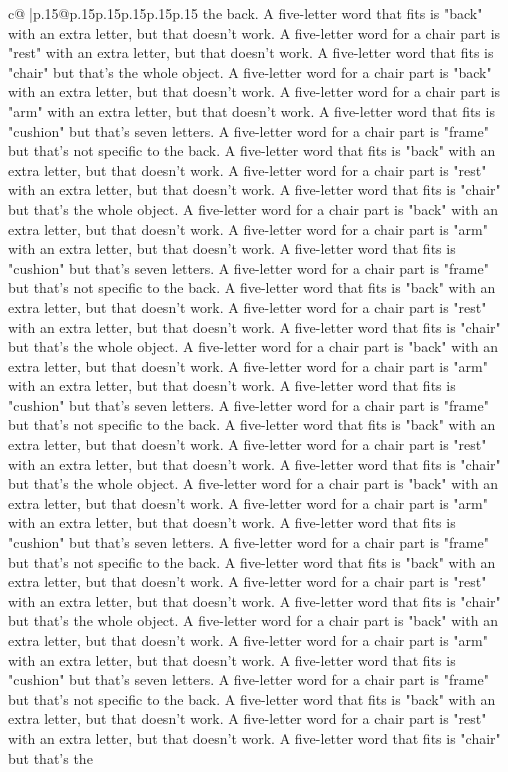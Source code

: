 \documentclass{article}
\begin{document}
{\begin{supertabular}{c@{$\;$}|p{.15\linewidth}@{}p{.15\linewidth}p{.15\linewidth}p{.15\linewidth}p{.15\linewidth}p{.15\linewidth}}
{{{the back. A five{-}letter word that fits is "back" with an extra letter, but that doesn't work. A five{-}letter word for a chair part is "rest" with an extra letter, but that doesn't work. A five{-}letter word that fits is "chair" but that's the whole object. A five{-}letter word for a chair part is "back" with an extra letter, but that doesn't work. A five{-}letter word for a chair part is "arm" with an extra letter, but that doesn't work. A five{-}letter word that fits is "cushion" but that's seven letters. A five{-}letter word for a chair part is "frame" but that's not specific to the back. A five{-}letter word that fits is "back" with an extra letter, but that doesn't work. A five{-}letter word for a chair part is "rest" with an extra letter, but that doesn't work. A five{-}letter word that fits is "chair" but that's the whole object. A five{-}letter word for a chair part is "back" with an extra letter, but that doesn't work. A five{-}letter word for a chair part is "arm" with an extra letter, but that doesn't work. A five{-}letter word that fits is "cushion" but that's seven letters. A five{-}letter word for a chair part is "frame" but that's not specific to the back. A five{-}letter word that fits is "back" with an extra letter, but that doesn't work. A five{-}letter word for a chair part is "rest" with an extra letter, but that doesn't work. A five{-}letter word that fits is "chair" but that's the whole object. A five{-}letter word for a chair part is "back" with an extra letter, but that doesn't work. A five{-}letter word for a chair part is "arm" with an extra letter, but that doesn't work. A five{-}letter word that fits is "cushion" but that's seven letters. A five{-}letter word for a chair part is "frame" but that's not specific to the back. A five{-}letter word that fits is "back" with an extra letter, but that doesn't work. A five{-}letter word for a chair part is "rest" with an extra letter, but that doesn't work. A five{-}letter word that fits is "chair" but that's the whole object. A five{-}letter word for a chair part is "back" with an extra letter, but that doesn't work. A five{-}letter word for a chair part is "arm" with an extra letter, but that doesn't work. A five{-}letter word that fits is "cushion" but that's seven letters. A five{-}letter word for a chair part is "frame" but that's not specific to the back. A five{-}letter word that fits is "back" with an extra letter, but that doesn't work. A five{-}letter word for a chair part is "rest" with an extra letter, but that doesn't work. A five{-}letter word that fits is "chair" but that's the whole object. A five{-}letter word for a chair part is "back" with an extra letter, but that doesn't work. A five{-}letter word for a chair part is "arm" with an extra letter, but that doesn't work. A five{-}letter word that fits is "cushion" but that's seven letters. A five{-}letter word for a chair part is "frame" but that's not specific to the back. A five{-}letter word that fits is "back" with an extra letter, but that doesn't work. A five{-}letter word for a chair part is "rest" with an extra letter, but that doesn't work. A five{-}letter word that fits is "chair" but that's the }}}
\end{supertabular}}
\end{document}
